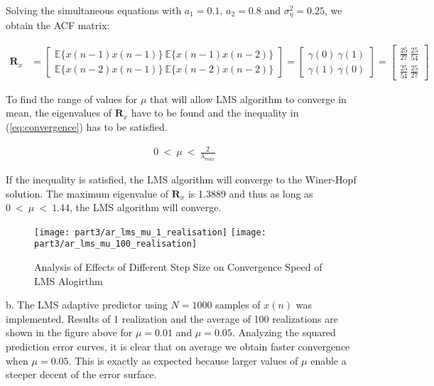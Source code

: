 \noindent{}Solving the simultaneous equations with $a_1=0.1$, $a_2=0.8$ and $\sigma_{\eta}^2=0.25$, we obtain the ACF matrix:

\begin{align*}
\textbf{R}_x &= 
\begin{bmatrix}
\mathbb{E}\{x(n-1)x(n-1)\} \ \mathbb{E}\{x(n-1)x(n-2)\} \\ 
\mathbb{E}\{x(n-2)x(n-1)\} \ \mathbb{E}\{x(n-2)x(n-2)\}
\end{bmatrix}
=
\begin{bmatrix}
\gamma(0) \ \gamma(1) \\ 
\gamma(1) \ \gamma(0)
\end{bmatrix}
= 
\begin{bmatrix}
\frac{25}{27} \ \frac{25}{54} \\ 
\frac{25}{54} \ \frac{25}{27}
\end{bmatrix}
\end{align*} 

\noindent{}To find the range of values for $\mu$ that will allow LMS algorithm to converge in mean, the eigenvalues of $\textbf{R}_x$ have to be found and the inequality in (\ref{eq:convergence}) has to be satisfied.

\begin{align}
0 \ < \ \mu \ < \ \frac{2}{\lambda_{max}} \label{eq:convergence}
\end{align}

\noindent{}If the inequality is satisfied, the LMS algorithm will converge to the Winer-Hopf solution. The maximum eigenvalue of $\textbf{R}_x$ is 1.3889 and thus as long as $0 \ < \ \mu \ < \ 1.44$, the LMS algorithm will converge.

\begin{figure}[H]
\centering{}
\texttt{[image: part3/ar\_lms\_mu\_1\_realisation]}
\texttt{[image: part3/ar\_lms\_mu\_100\_realisation]}
\caption{Analysis of Effects of Different Step Size on Convergence Speed of LMS Alogirthm}
\end{figure}

\noindent{}b. The LMS adaptive predictor using $N=1000$ samples of $x(n)$ was implemented. Results of 1 realization and the average of 100 realizations are shown in the figure above for $\mu=0.01$ and $\mu=0.05$. Analyzing the squared prediction error curves, it is clear that on average we obtain faster convergence when $\mu=0.05$. This is exactly as expected because larger values of $\mu$ enable a steeper decent of the error surface.

